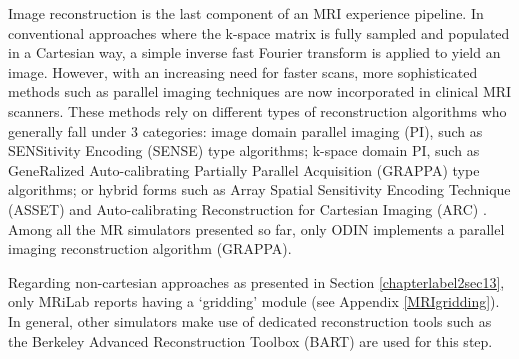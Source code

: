 Image reconstruction is the last component of an MRI experience pipeline.
In conventional approaches where the k-space matrix is fully sampled and populated in a Cartesian way, a simple inverse fast Fourier transform is applied to yield an image.
However, with an increasing need for faster scans, more sophisticated methods such as parallel imaging techniques are now incorporated in clinical MRI scanners.
These methods rely on different types of reconstruction algorithms who generally fall under 3 categories: image domain parallel imaging (PI), such as SENSitivity Encoding (SENSE) type algorithms; k-space domain PI, such as GeneRalized Auto-calibrating Partially Parallel Acquisition (GRAPPA) type algorithms; or hybrid forms such as Array Spatial Sensitivity Encoding Technique (ASSET) and Auto-calibrating Reconstruction for Cartesian Imaging (ARC) \cite{Deshmane2012}.
Among all the MR simulators presented so far, only ODIN \cite{Jochimsen2004} implements a parallel imaging reconstruction algorithm (GRAPPA).

\hfill

Regarding non-cartesian approaches as presented in Section \ref{chapterlabel2sec13}, only MRiLab \cite{Liu2017} reports having a `gridding' module (see Appendix \ref{MRIgridding}).
In general, other simulators make use of dedicated reconstruction tools such as the Berkeley Advanced Reconstruction Toolbox (BART) \cite{Lustig2016} are used for this step.
